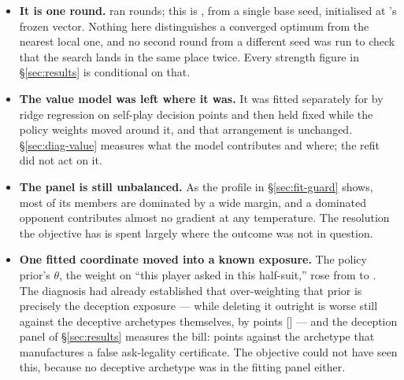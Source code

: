 \begin{itemize}
  \item \textbf{It is one round.} \vfour{} ran \numVfourFitRounds{} rounds; this
        is \numFitRounds{}, from a single base seed, initialised at \vfour{}'s
        frozen vector. Nothing here distinguishes a converged optimum from the
        nearest local one, and no second round from a different seed was run to
        check that the search lands in the same place twice. Every strength
        figure in \S\ref{sec:results} is conditional on that.
  \item \textbf{The value model was left where it was.} It was fitted
        separately for \vfour{} by ridge regression on self-play decision points
        and then held fixed while the policy weights moved around it, and that
        arrangement is unchanged. \S\ref{sec:diag-value} measures what the model
        contributes and where; the refit did not act on it.
  \item \textbf{The panel is still unbalanced.} As the profile in
        \S\ref{sec:fit-guard} shows, most of its members are dominated by a wide
        margin, and a dominated opponent contributes almost no gradient at any
        temperature. The resolution the objective has is spent largely where the
        outcome was not in question.
  \item \textbf{One fitted coordinate moved into a known exposure.} The policy
        prior's $\theta$, the weight on ``this player asked in this half-suit,''
        rose from \numPriorThetaFour{} to \numPriorThetaFive{}. The diagnosis had
        already established that over-weighting that prior is precisely the
        deception exposure --- while deleting it outright is worse still against
        the deceptive archetypes themselves, by \numPriorDeleteCost{} points
        [\numPriorDeleteCI] --- and the deception panel of
        \S\ref{sec:results} measures the bill: \numDecFeintDelta{} points against
        the archetype that manufactures a false ask-legality certificate. The
        objective could not have seen this, because no deceptive archetype was in
        the fitting panel either.
\end{itemize}
